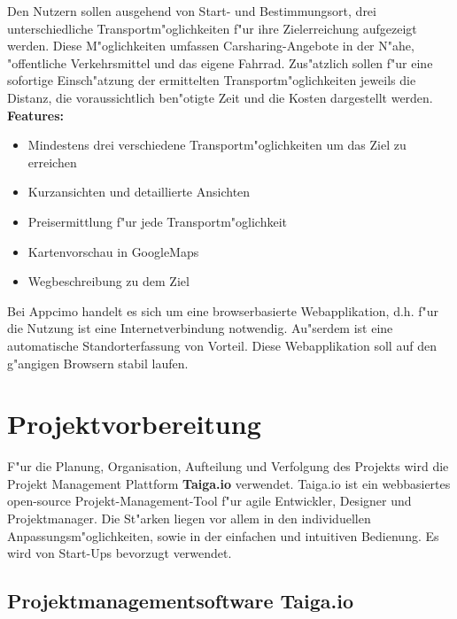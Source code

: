 \documentclass[a4paper, 11pt]{scrreprt}
\begin{document}
Den Nutzern sollen ausgehend von Start- und Bestimmungsort, drei unterschiedliche Transportm"oglichkeiten f"ur ihre Zielerreichung aufgezeigt werden. Diese M"oglichkeiten umfassen Carsharing-Angebote in der N"ahe, "offentliche Verkehrsmittel und das eigene Fahrrad. Zus"atzlich sollen f"ur eine sofortige Einsch"atzung der ermittelten Transportm"oglichkeiten jeweils die Distanz, die voraussichtlich ben"otigte Zeit und die Kosten dargestellt werden. \\

\textbf{Features:}
\begin{itemize}
\item Mindestens drei verschiedene Transportm"oglichkeiten um das Ziel zu erreichen\\
\item Kurzansichten und detaillierte Ansichten\\
\item Preisermittlung f"ur jede Transportm"oglichkeit\\
\item Kartenvorschau in GoogleMaps\\
\item Wegbeschreibung zu dem Ziel\\


\end{itemize}

Bei Appcimo handelt es sich um eine browserbasierte Webapplikation, d.h. f"ur die Nutzung ist eine Internetverbindung notwendig. Au"serdem ist eine automatische Standorterfassung von Vorteil.
Diese Webapplikation soll auf den g"angigen Browsern stabil laufen.


\chapter{Projektvorbereitung}
F"ur die Planung, Organisation, Aufteilung und Verfolgung des Projekts wird die Projekt Management Plattform \textbf{Taiga.io} verwendet. Taiga.io ist ein webbasiertes open-source Projekt-Management-Tool f"ur agile Entwickler, Designer und Projektmanager. Die St"arken liegen vor allem in den individuellen Anpassungsm"oglichkeiten, sowie in der einfachen und intuitiven Bedienung. Es wird von Start-Ups bevorzugt verwendet.


\section{Projektmanagementsoftware Taiga.io}
\end{document}
